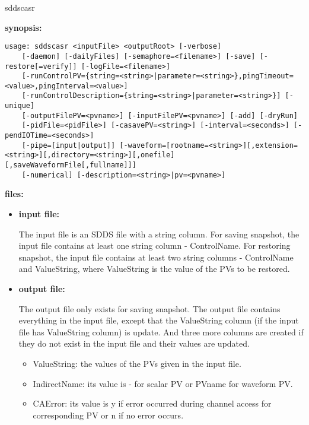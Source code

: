 \begin{sddsprog}{sddscasr}
\item {\bf synopsis:} 
%
%
\begin{verbatim}
usage: sddscasr <inputFile> <outputRoot> [-verbose]
    [-daemon] [-dailyFiles] [-semaphore=<filename>] [-save] [-restore[=verify]] [-logFile=<filename>]
    [-runControlPV={string=<string>|parameter=<string>},pingTimeout=<value>,pingInterval=<value>]
    [-runControlDescription={string=<string>|parameter=<string>}] [-unique]
    [-outputFilePV=<pvname>] [-inputFilePV=<pvname>] [-add] [-dryRun]
    [-pidFile=<pidFile>] [-casavePV=<string>] [-interval=<seconds>] [-pendIOTime=<seconds>]
    [-pipe=[input|output]] [-waveform=[rootname=<string>][,extension=<string>][,directory=<string>][,onefile][,saveWaveformFile[,fullname]]]
    [-numerical] [-description=<string>|pv=<pvname>]
\end{verbatim}
\item {\bf files:}
\begin{itemize}
\item {\bf input file:} \par
The input file is an SDDS file with a string column. For saving snapshot, the input file
contains at least one string column - ControlName. For restoring snapshot, the input file
contains at least two string columns - ControlName and ValueString, where ValueString is the
value of the PVs to be restored.
\item {\bf output file:} \par
The output file only exists for saving snapshot. The output file contains everything in the input
file, except that the ValueString column (if the input file has ValueString column) is update. And
three more columns are created if they do not exist in the input file and their values are updated.
\begin{itemize}
\item {ValueString}: the values of the PVs given in the input file.
\item {IndirectName}: its value  is - for scalar PV or PVname for waveform PV.
\item {CAError}: its value is y if error occurred during channel access for
corresponding PV or n if no error occurs.
\end{itemize}
\end{itemize}


\end{sddsprog}
